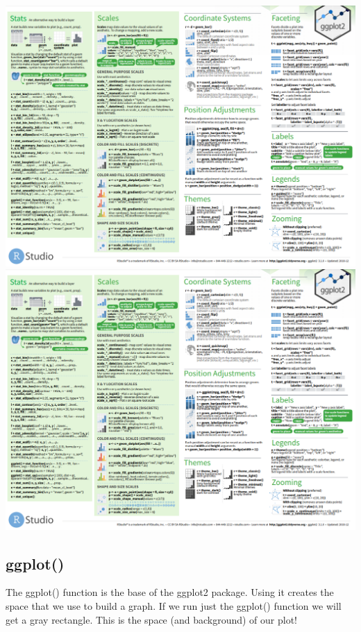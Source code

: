 \documentclass[
  letterpaper,
  DIV=11,
  numbers=noendperiod]{scrartcl}
\begin{document}
\includegraphics{images/ggplot cheat sheet 2.png}\\

\includegraphics{images/ggplot cheat sheet 2.png}\\

\subsection{\texorpdfstring{\textbf{ggplot()}}{ggplot()}}

The ggplot() function is the base of the ggplot2 package. Using it
creates the space that we use to build a graph. If we run just the
ggplot() function we will get a gray rectangle. This is the space (and
background) of our plot!
\end{document}
